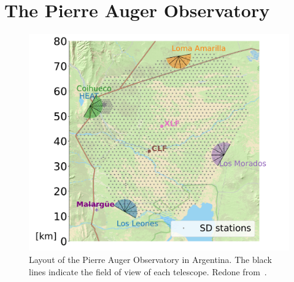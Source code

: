 
\chapter{The Pierre Auger Observatory}
\label{chap:setup}
\begin{figure}[h!]
\centering
\includegraphics[width=\textwidth]{thesis_figures/Setup/map_srij_version.pdf}
\caption{Layout of the Pierre Auger Observatory in Argentina. The black lines indicate the field of view of each telescope. Redone from~\cite{Jannis_thesis}.}
\label{fig:Auger_map}
\end{figure}


